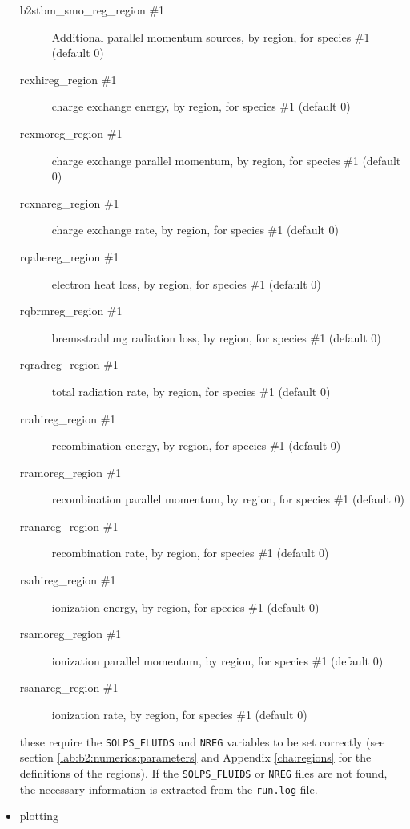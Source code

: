 \documentclass[a4paper,10pt]{report}
\begin{document}
\begin{itemize}
\begin{description}
  \item[b2stbm\_smo\_reg\_region \#1] Additional parallel momentum sources, by
    region, for species  \#1 (default 0)
  \item[rcxhireg\_region \#1] charge exchange
    energy, by region, for species  \#1 (default 0)
  \item[rcxmoreg\_region \#1] charge exchange
    parallel momentum, by region, for species  \#1 (default 0)
  \item[rcxnareg\_region \#1] charge exchange
    rate, by region, for species  \#1 (default 0)
  \item[rqahereg\_region \#1] electron heat loss,
    by region, for species  \#1 (default 0)
  \item[rqbrmreg\_region \#1] bremsstrahlung radiation loss,
    by region, for species  \#1 (default 0)
  \item[rqradreg\_region \#1] total radiation rate,
    by region, for species  \#1 (default 0)
  \item[rrahireg\_region \#1] recombination
    energy, by region, for species  \#1 (default 0)
  \item[rramoreg\_region \#1] recombination
    parallel momentum, by region, for species  \#1 (default 0)
  \item[rranareg\_region \#1] recombination rate,
    by region, for species  \#1 (default 0)
  \item[rsahireg\_region \#1] ionization energy,
    by region, for species  \#1 (default 0)
  \item[rsamoreg\_region \#1] ionization
    parallel momentum, by region, for species  \#1 (default 0)
  \item[rsanareg\_region \#1] ionization rate, by
    region, for species  \#1 (default 0)
  \end{description}
these require the {\tt SOLPS\_FLUIDS} and {\tt NREG} variables to be set
correctly (see section \ref{lab:b2:numerics:parameters} and Appendix \ref{cha:regions}
for the definitions of the regions). If
the {\tt SOLPS\_FLUIDS} or {\tt NREG} files are not found, the necessary
information is extracted from the {\tt run.log} file.
\item plotting

\end{itemize}
\end{document}
